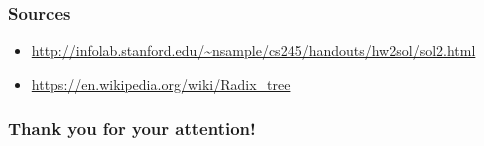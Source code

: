 \documentclass{beamer}
\begin{document}
\begin{frame}
\frametitle{Sources}
\begin{itemize}
	\item \url{http://infolab.stanford.edu/~nsample/cs245/handouts/hw2sol/sol2.html}
	\item \url{https://en.wikipedia.org/wiki/Radix\_tree}
\end{itemize}
\end{frame}

\begin{frame}
 \frametitle{Thank you for your attention!}
\end{frame}
\end{document}
